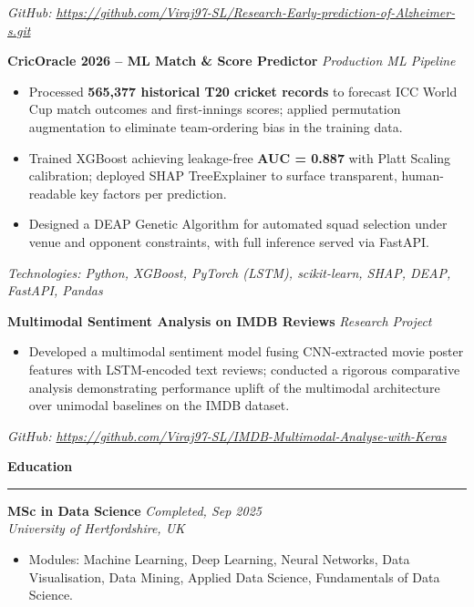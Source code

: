 \documentclass[a4paper,10pt]{article}
\newcommand{\sect}[1]{\vspace{8pt}\noindent\textbf{\color{heading}\large #1}\vspace{3pt}\hrule\vspace{6pt}}
\begin{document}
\textit{GitHub: \url{https://github.com/Viraj97-SL/Research-Early-prediction-of-Alzheimer-s.git}}
\vspace{8pt}

\noindent\textbf{CricOracle 2026 -- ML Match \& Score Predictor} \hfill \textit{Production ML Pipeline}
\begin{itemize}[leftmargin=*, topsep=4pt, itemsep=2pt]
    \item Processed \textbf{565,377 historical T20 cricket records} to forecast ICC World Cup match outcomes and first-innings scores; applied permutation augmentation to eliminate team-ordering bias in the training data.
    \item Trained XGBoost achieving leakage-free \textbf{AUC = 0.887} with Platt Scaling calibration; deployed SHAP TreeExplainer to surface transparent, human-readable key factors per prediction.
    \item Designed a DEAP Genetic Algorithm for automated squad selection under venue and opponent constraints, with full inference served via FastAPI.
\end{itemize}
\textit{Technologies: Python, XGBoost, PyTorch (LSTM), scikit-learn, SHAP, DEAP, FastAPI, Pandas}
\vspace{8pt}

\noindent\textbf{Multimodal Sentiment Analysis on IMDB Reviews} \hfill \textit{Research Project}
\begin{itemize}[leftmargin=*, topsep=4pt, itemsep=2pt]
    \item Developed a multimodal sentiment model fusing CNN-extracted movie poster features with LSTM-encoded text reviews; conducted a rigorous comparative analysis demonstrating performance uplift of the multimodal architecture over unimodal baselines on the IMDB dataset.
\end{itemize}
\textit{GitHub: \url{https://github.com/Viraj97-SL/IMDB-Multimodal-Analyse-with-Keras}}

\sect{Education}
\noindent\textbf{MSc in Data Science} \hfill \textit{Completed, Sep 2025} \\
\textit{University of Hertfordshire, UK}
\begin{itemize}[leftmargin=*, topsep=2pt, itemsep=0pt]
    \item Modules: Machine Learning, Deep Learning, Neural Networks, Data Visualisation, Data Mining, Applied Data Science, Fundamentals of Data Science.
\end{itemize}
\vspace{4pt}
\end{document}
